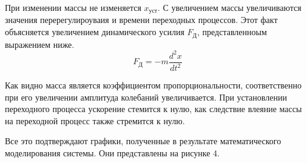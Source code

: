 \documentclass[a4paper, 12pt]{article}
\begin{document}
При изменении массы не изменяется $x_\text{уст}$. С увеличением массы увеличиваются значения перерегулироуваия и времени переходных процессов. Этот факт объясняется увеличением динамического усилия $F_\text{Д}$, представленноым выражением ниже.
\begin{equation*}
    F_\text{Д} = -m \frac{d^2x}{dt^2}
\end{equation*}
\par
Как видно масса является коэффициентом пропорциональности, соответственно при его увеличении амплитуда колебаний увеличивается. При установлении переходного процесса ускорение стемится к нулю, как следствие влеяние массы на переходной процесс также стремится к нулю. \par
Все это подтверждают графики, полученные в результате математического моделирования системы. Они представлены на рисунке 4.
\end{document}
